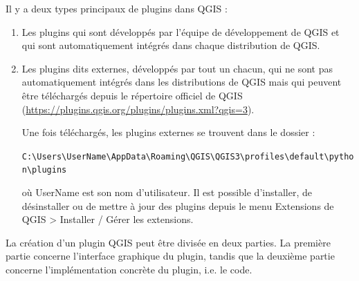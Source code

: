 \documentclass[11pt]{article}
\begin{document}
Il y a deux types principaux de plugins dans QGIS :
\begin{enumerate}\itemsep0.4em
\item Les plugins qui sont développés par l'équipe de développement de QGIS et qui sont automatiquement intégrés dans chaque distribution de QGIS. 
\item Les plugins dits \og{}externes\fg{}, développés par tout un chacun, qui ne sont pas automatiquement intégrés dans les distributions de QGIS mais qui peuvent être téléchargés depuis le répertoire officiel de QGIS (\url{https://plugins.qgis.org/plugins/plugins.xml?qgis=3}).

Une fois téléchargés, les plugins externes se trouvent dans le dossier : 

\begin{center}
\texttt{C:\textbackslash{}Users\textbackslash{}\textcolor{mygreen}{UserName}\textbackslash{}AppData\textbackslash{}Roaming\textbackslash{}QGIS\textbackslash{}QGIS3\textbackslash{}profiles\textbackslash{}default\textbackslash{}python\textbackslash{}plugins} 
\end{center}

où \textcolor{mygreen}{UserName} est son nom d'utilisateur. Il est possible d'installer, de désinstaller ou de mettre à jour des plugins depuis le menu \og{}Extensions\fg{} de QGIS >{} \og{}Installer / Gérer les extensions\fg{}. 
\end{enumerate} 



La création d'un plugin QGIS peut être divisée en deux parties. La première partie concerne l'interface graphique du plugin, tandis que la deuxième partie concerne l'implémentation concrète du plugin, i.e. le code. 
\end{document}
